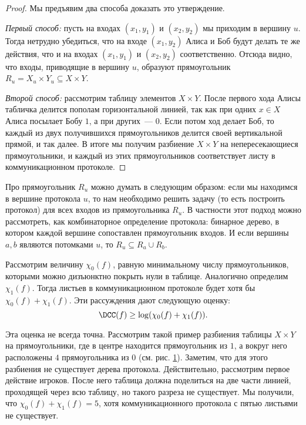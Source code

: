 \begin{proof}
    Мы предъявим два способа доказать это утверждение.
    
    \textit{Первый способ:} пусть на входах $(x_1, y_1)$ и $(x_2, y_2)$ мы приходим в вершину $u$. Тогда
    нетрудно убедиться, что на входе $(x_1, y_2)$ Алиса и Боб будут делать те же действия, что и на входах
    $(x_1, y_1)$ и $(x_2, y_2)$ соответственно. Отсюда видно, что входы, приводящие в вершину $u$,
    образуют прямоугольник $R_u = X_u \times Y_u \subseteq X \times Y$. 
    
    \textit{Второй способ:} рассмотрим таблицу элементов $X \times Y$. После первого хода Алисы табличка
    делится пополам горизонтальной линией, так как при одних $x \in X$ Алиса посылает Бобу $1$, а при
    других~--- $0$. Если потом ход делает Боб, то каждый из двух получившихся прямоугольников делится
    своей вертикальной прямой, и так далее. В итоге мы получим разбиение $X \times Y$ на непересекающиеся
    прямоугольники, и каждый из этих прямоугольников соответствует листу в коммуникационном протоколе.  
\end{proof}


Про прямоугольник $R_u$ можно думать в следующим образом: если мы находимся в вершине протокола $u$, то
нам необходимо решить задачу (то есть построить протокол) для всех входов из прямоугольника $R_u$. В
частности этот подход можно рассмотреть, как комбинаторное определение протокола: бинарное дерево, в
котором каждой вершине сопоставлен прямоугольник входов. И если вершины $a, b$ являются потомками $u$, то
$R_u \subseteq R_a \cup R_b$.

Рассмотрим величину $\chi_0(f)$, равную минимальному числу прямоугольников, которыми можно дизъюнктно
покрыть нули в таблице. Аналогично определим $\chi_1(f)$. Тогда листьев в коммуникационном протоколе
будет хотя бы $\chi_0(f) + \chi_1(f)$. Эти рассуждения дают следующую оценку:
$$
    \DCC(f) \ge \log(\chi_0(f) + \chi_1(f)).
$$

Эта оценка не всегда точна. Рассмотрим такой пример разбиения таблицы $X \times Y$ на прямоугольники, где в
центре находится прямоугольник из $1$, а вокруг него расположены $4$ прямоугольника из $0$
(см. рис. \ref{fig:partition-rect}). Заметим, что для этого разбиения не существует дерева
протокола. Действительно, рассмотрим первое действие игроков. После него таблица должна поделиться на две
части линией, проходящей через всю таблицу, но такого разреза не существует. Мы получили, что $\chi_0(f)
+ \chi_1(f) = 5$, хотя коммуникационного протокола с пятью листьями не существует.
\begin{figure}[h]
 	\centering
    
 	\caption{}
 	\label{fig:partition-rect}
\end{figure}
	

